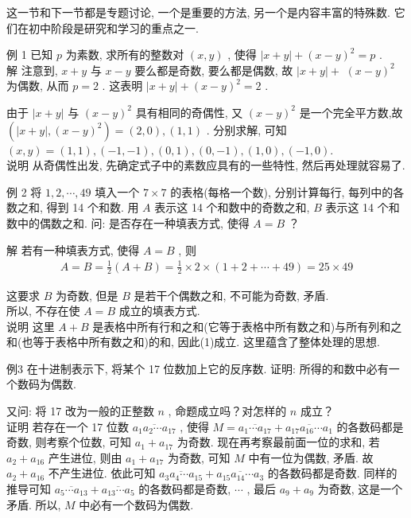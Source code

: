 	这一节和下一节都是专题讨论, 一个是重要的方法, 另一个是内容丰富的特殊数. 它们在初中阶段是研究和学习的重点之一.

	例 1 已知 $p$ 为素数, 求所有的整数对 $(x, y)$ , 使得 $|x+y|+(x-y)^{2}=p$ . \\
	解 注意到,  $x+y$ 与 $x-y$ 要么都是奇数, 要么都是偶数, 故 $|x+y|+$ $(x-y)^{2}$ 为偶数, 从而 $p=2$ . 这表明 $|x+y|+(x-y)^{2}=2$ .

	由于 $|x+y|$ 与 $(x-y)^{2}$ 具有相同的奇偶性, 又 $(x-y)^{2}$ 是一个完全平方数,故 $\left(|x+y|,(x-y)^{2}\right)=(2,0),(1,1)$ . 分别求解, 可知\\
$(x, y)=(1,1),(-1,-1),(0,1),(0,-1),(1,0),(-1,0)$.\\
	说明 从奇偶性出发, 先确定式子中的素数应具有的一些特性, 然后再处理就容易了.

	例 2 将 $1,2, \cdots, 49$ 填入一个 $7 \times 7$ 的表格(每格一个数), 分别计算每行, 每列中的各数之和, 得到 14 个和数. 用 $A$ 表示这 14 个和数中的奇数之和,  $B$ 表示这 14 个和数中的偶数之和. 问: 是否存在一种填表方式, 使得 $A=B$ ？

	解 若有一种填表方式, 使得 $A=B$ , 则
	\begin{align*}
		A=B=\frac{1}{2}(A+B)=\frac{1}{2} \times 2 \times(1+2+\cdots+49)=25 \times 49
	\end{align*}

	这要求 $B$ 为奇数, 但是 $B$ 是若干个偶数之和, 不可能为奇数, 矛盾. \\
	所以, 不存在使 $A=B$ 成立的填表方式. \\
	说明 这里 $A+B$ 是表格中所有行和之和(它等于表格中所有数之和)与所有列和之和(也等于表格中所有数之和)的和, 因此(1)成立. 这里蕴含了整体处理的思想.

	例3 在十进制表示下, 将某个 17 位数加上它的反序数. 证明: 所得的和数中必有一个数码为偶数.

	又问: 将 17 改为一般的正整数 $n$ , 命题成立吗？对怎样的 $n$ 成立？\\
	证明 若存在一个 17 位数 $\overline{a_{1} a_{2} \cdots a_{17}}$ , 使得 $M=\overline{a_{1} \cdots a_{17}}+\overline{a_{17} a_{16} \cdots a_{1}}$ 的各数码都是奇数, 则考察个位数, 可知 $a_{1}+a_{17}$ 为奇数. 现在再考察最前面一位的求和, 若 $a_{2}+a_{16}$ 产生进位, 则由 $a_{1}+a_{17}$ 为奇数, 可知 $M$ 中有一位为偶数, 矛盾. 故 $a_{2}+a_{16}$ 不产生进位. 依此可知 $\overline{a_{3} a_{4} \cdots a_{15}}+\overline{a_{15} a_{14} \cdots a_{3}}$ 的各数码都是奇数. 同样的推导可知 $\overline{a_{5} \cdots a_{13}}+\overline{a_{13} \cdots a_{5}}$ 的各数码都是奇数,  $\cdots$ , 最后 $a_{9}+a_{9}$ 为奇数, 这是一个矛盾. 所以,  $M$ 中必有一个数码为偶数.

